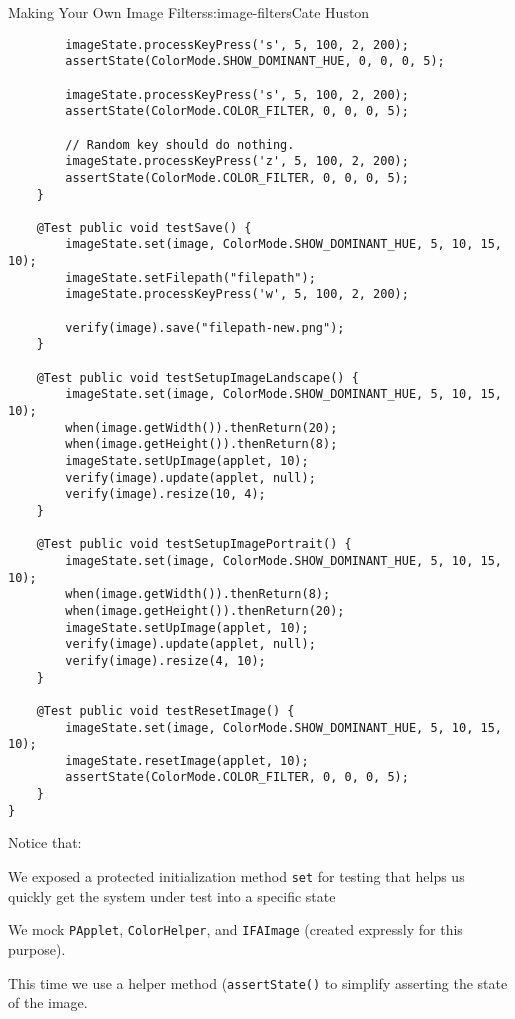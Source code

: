 \begin{aosachapter}{Making Your Own Image Filters}{s:image-filters}{Cate Huston}
\begin{verbatim}
        imageState.processKeyPress('s', 5, 100, 2, 200);
        assertState(ColorMode.SHOW_DOMINANT_HUE, 0, 0, 0, 5);

        imageState.processKeyPress('s', 5, 100, 2, 200);
        assertState(ColorMode.COLOR_FILTER, 0, 0, 0, 5);

        // Random key should do nothing.
        imageState.processKeyPress('z', 5, 100, 2, 200);
        assertState(ColorMode.COLOR_FILTER, 0, 0, 0, 5);
    }

    @Test public void testSave() {
        imageState.set(image, ColorMode.SHOW_DOMINANT_HUE, 5, 10, 15, 10);
        imageState.setFilepath("filepath");
        imageState.processKeyPress('w', 5, 100, 2, 200);

        verify(image).save("filepath-new.png");
    }

    @Test public void testSetupImageLandscape() {
        imageState.set(image, ColorMode.SHOW_DOMINANT_HUE, 5, 10, 15, 10);
        when(image.getWidth()).thenReturn(20);
        when(image.getHeight()).thenReturn(8);
        imageState.setUpImage(applet, 10);
        verify(image).update(applet, null);
        verify(image).resize(10, 4);
    }

    @Test public void testSetupImagePortrait() {
        imageState.set(image, ColorMode.SHOW_DOMINANT_HUE, 5, 10, 15, 10);
        when(image.getWidth()).thenReturn(8);
        when(image.getHeight()).thenReturn(20);
        imageState.setUpImage(applet, 10);
        verify(image).update(applet, null);
        verify(image).resize(4, 10);
    }

    @Test public void testResetImage() {
        imageState.set(image, ColorMode.SHOW_DOMINANT_HUE, 5, 10, 15, 10);
        imageState.resetImage(applet, 10);
        assertState(ColorMode.COLOR_FILTER, 0, 0, 0, 5);
    }
}
\end{verbatim}

Notice that:

\begin{aosaitemize}

\item
  We exposed a protected initialization method \texttt{set} for testing
  that helps us quickly get the system under test into a specific state
\item
  We mock \texttt{PApplet}, \texttt{ColorHelper}, and \texttt{IFAImage}
  (created expressly for this purpose).
\item
  This time we use a helper method (\texttt{assertState()} to simplify
  asserting the state of the image.
\end{aosaitemize}


\end{aosachapter}
